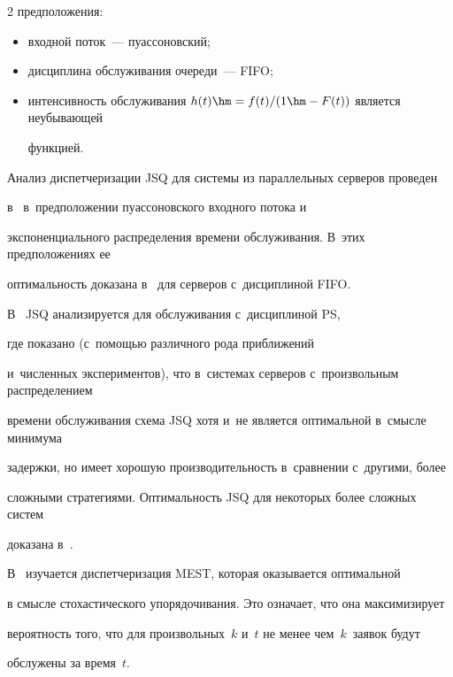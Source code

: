 \begin{multicols}{2}
предположения:


    \begin{itemize}


    \item  входной поток~--- пуассоновский;


    \item дисциплина обслуживания очереди~--- FIFO;


    \item интенсивность обслуживания $h(t)\hm= f(t)/(1\hm-F(t))$ является неубывающей 


функцией.


    \end{itemize}


    


    Анализ диспетчеризации JSQ для системы из параллельных серверов проведен 


в~\cite{13-kon, 14-kon} в~предположении пуассоновского входного потока и~


экспоненциального распределения времени обслуживания. В~этих предположениях ее 


оптимальность доказана в~\cite{11-kon} для серверов с~дисциплиной FIFO.  


В~\cite{16-kon} JSQ анализируется для обслуживания с~дисциплиной PS, 


где показано (с~по\-мощью различного рода приближений 


и~численных экспериментов), что в~системах серверов с~произвольным распределением 


времени обслуживания схема JSQ хотя и~не является оптимальной в~смысле минимума 


задержки, но имеет хорошую производительность в~сравнении с~другими, более 


сложными стратегиями. Оптимальность JSQ для некоторых более сложных систем 


доказана в~\cite{17-kon}.


    


    В~\cite{12-kon} изучается диспетчеризация MEST, которая оказывается оптимальной 


в смысле стохастического упорядочивания. Это означает, что она максимизи\-рует 


вероятность того, что для произвольных~$k$ и~$t$ не менее чем~$k$~заявок будут 


обслужены за время~$t$.



\end{multicols}
